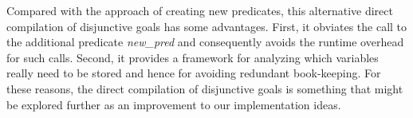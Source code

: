 Compared with the approach of creating new predicates, this
alternative direct compilation of disjunctive goals has some
advantages. First, it obviates the call to the additional predicate
{\it new\_pred} and consequently avoids the runtime overhead for such
calls. Second, it provides a framework for analyzing which variables
really need to be stored and hence for avoiding redundant
book-keeping.
For these reasons, the direct compilation of disjunctive goals is
something that might be explored further as an improvement to our
implementation ideas.
